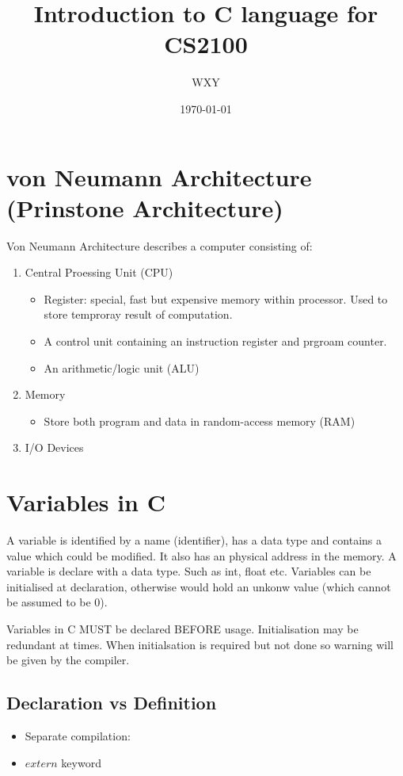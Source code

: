 \documentclass[12pt]{article} %
\title{Introduction to C language for CS2100}
\author{WXY}
\date{\today}
\begin{document}
\maketitle

\tableofcontents %

\section{von Neumann Architecture (Prinstone Architecture)}
Von Neumann Architecture describes a computer consisting of:
\begin{enumerate}
    \item Central Proessing Unit (CPU) 
    \begin{itemize}
        \item Register: special, fast but expensive memory within processor. Used to store temproray result of computation. 
        \item A control unit containing an instruction register and prgroam counter.
        \item An arithmetic/logic unit (ALU)
    \end{itemize}
    \item Memory
    \begin{itemize}
        \item Store both program and data in random-access memory (RAM)
    \end{itemize}
    \item I/O Devices
\end{enumerate}
\section{Variables in C}
A variable is identified by a name (identifier), has a data type and contains a value which could be modified. It also has an physical address in the memory.
A variable is declare with a data type. Such as int, float etc.
Variables can be initialised at declaration, otherwise would hold an unkonw value (which cannot be assumed to be 0).

Variables in C MUST be declared BEFORE usage.
Initialisation may be redundant at times. When initialsation is required but not done so warning will be given by the compiler.
\subsection*{Declaration vs Definition}
\begin{itemize}
    \item Separate compilation: 
    \item \(extern\) keyword
\end{itemize}
\end{document}
